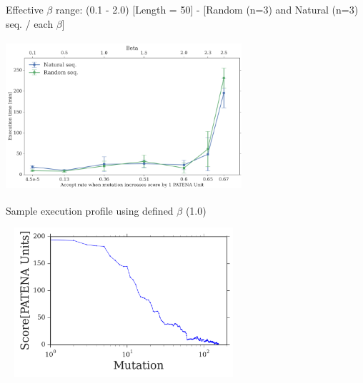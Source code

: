 \documentclass{beamer}
\begin{document}
\begin{frame}[plain]{Effective $\beta$ range: (0.1 - 2.0)}
\centering
[Length = 50] - [Random (n=3) and Natural (n=3) seq. / each $\beta$] \\
\begin{adjustwidth}{-1.5em}{-2.5em}
\includegraphics[width=330px,height=210px]{../img/betaVsTime.png} 
\end{adjustwidth}
\end{frame}





\begin{frame}[plain]{Sample execution profile using defined $\beta$ (1.0)}
\begin{adjustwidth}{-1.5em}{-2.5em}
\centering

\includegraphics[width=330px,height=210px]{../img/iterationVsScore-individualBeta1-EXAMPLE.png}

\end{adjustwidth}
\end{frame}
\end{document}
